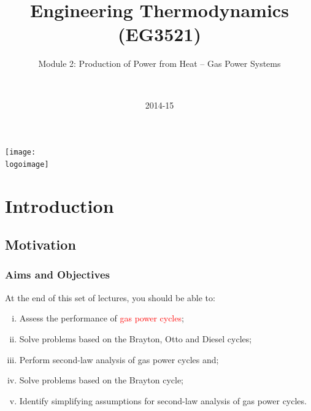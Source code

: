 \documentclass[10pt,compress]{beamer}
\institute{School of Engineering}
\title{Engineering Thermodynamics (EG3521)}
\subtitle{Module 2: Production of Power from Heat -- Gas Power Systems}
\date[2014-15]{2014-15}
\author[\shortname]{%
  \fullname\\\ttfamily{\emailaddress}
}
\newcommand{\logoimage}{../FigBanner/UoAHorizBanner}
\newcommand{\red}{\textcolor{red}}
\begin{document}
\begin{frame}
  \titlepage
  \vfill%
  \begin{center}
    \texttt{[image: \\logoimage]}
  \end{center}
\end{frame}




\section{Introduction}

\subsection{Motivation}
\begin{frame}
 \frametitle{Aims and Objectives}
 At the end of this set of lectures, you should be able to:
 \begin{enumerate}[(i)]
  \item <1-> Assess the performance of \red{gas power cycles};
  \item <2-> Solve problems based on the Brayton, Otto and Diesel cycles;
  \item <3-> Perform second-law analysis of gas power cycles and;
  \item <4-> Solve problems based on the Brayton cycle;
  \item <5-> Identify simplifying assumptions for second-law analysis of gas power cycles.
 \end{enumerate}
\end{frame}


\end{document}
